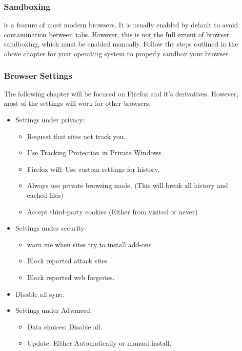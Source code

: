 \documentclass[a4paper,11pt]{book}
\begin{document}
		\subsubsection{Sandboxing}
			is a feature of most modern browsers. It is usually enabled by default to avoid contamination between tabs. 
			However, this is not the full extent of browser sandboxing, which must be enabled manually. 
			Follow the steps outlined in the above chapter for your operating system to properly sandbox your browser. 
		\subsubsection{Browser Settings}
			The following chapter will be focused on Firefox and it's derivatives. 
			However, most of the settings will work for other browsers. 
			\begin{itemize}
				\item Settings under privacy:
					\begin{itemize}
						\item Request that sites not track you. 
						\item Use Tracking Protection in Private Windows. 
						\item Firefox will: Use custom settings for history. 
						\item Always use private browsing mode. (This will break all history and cached files) 
						\item Accept third-party cookies (Either from visited or never)
					\end{itemize}
				\item Settings under security:
					\begin{itemize}
						\item warn me when sites try to install add-ons
						\item Block reported attack sites
						\item Block reported web forgeries. 
					\end{itemize}
				\item Disable all sync. 
				\item Settings under Advanced:
					\begin{itemize}
						\item Data choices: Disable all.
						\item Update: Either Automatically or manual install. 
					\end{itemize}
			\end{itemize}
\end{document}
